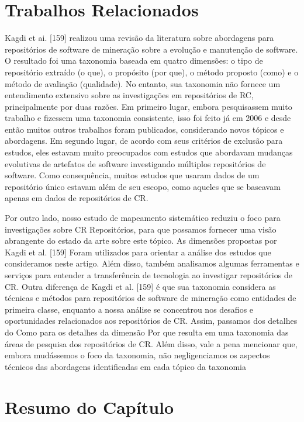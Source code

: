 \section{Trabalhos Relacionados}
Kagdi et ai. [159] realizou uma revisão da literatura sobre abordagens para
repositórios de software de mineração sobre a evolução e manutenção de software.
O resultado foi uma taxonomia baseada em quatro dimensões: o tipo de repositório
extraído (o que), o propósito (por que), o método proposto (como) e o método de
avaliação (qualidade). No entanto, sua taxonomia não fornece um entendimento
extensivo sobre as investigações em repositórios de RC, principalmente por duas
razões. Em primeiro lugar, embora pesquisassem muito trabalho e fizessem uma
taxonomia consistente, isso foi feito já em 2006 e desde então muitos outros
trabalhos foram publicados, considerando novos tópicos e abordagens. Em segundo
lugar, de acordo com seus critérios de exclusão para estudos, eles estavam muito
preocupados com estudos que abordavam mudanças evolutivas de artefatos de
software investigando múltiplos repositórios de software. Como consequência,
muitos estudos que usaram dados de um repositório único estavam além de seu
escopo, como aqueles que se baseavam apenas em dados de repositórios de CR\@.

Por outro lado, nosso estudo de mapeamento sistemático reduziu o foco para
investigações sobre CR Repositórios, para que possamos fornecer uma visão
abrangente do estado da arte sobre este tópico. As dimensões propostas por Kagdi
et al. [159] Foram utilizados para orientar a análise dos estudos que
consideramos neste artigo. Além disso, também analisamos algumas ferramentas e
serviços para entender a transferência de tecnologia ao investigar repositórios
de CR\@. Outra diferença de Kagdi et al. [159] é que sua taxonomia considera as
técnicas e métodos para repositórios de software de mineração como entidades de
primeira classe, enquanto a nossa análise se concentrou nos desafios e
oportunidades relacionados aos repositórios de CR\@. Assim, passamos dos detalhes
do Como para os detalhes da dimensão Por que resulta em uma taxonomia das áreas
de pesquisa dos repositórios de CR\@. Além disso, vale a pena mencionar que,
embora mudássemos o foco da taxonomia, não negligenciamos os aspectos técnicos
das abordagens identificadas em cada tópico da taxonomia

\section{Resumo do Capítulo}